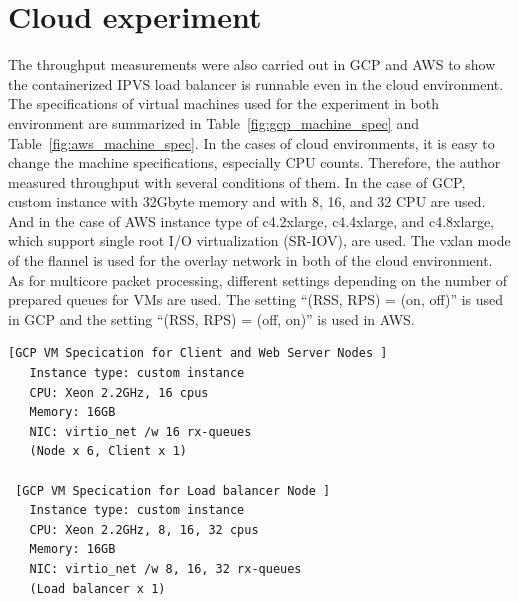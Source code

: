 \FloatBarrier

\section{Cloud experiment}

The throughput measurements were also carried out in GCP and AWS to show the containerized IPVS load balancer is runnable even in the cloud environment.
The specifications of virtual machines used for the experiment in both environment are summarized in Table~\ref{fig:gcp_machine_spec} and Table~\ref{fig:aws_machine_spec}.
In the cases of cloud environments, it is easy to change the machine specifications, especially CPU counts.
Therefore, the author measured throughput with several conditions of them.
In the case of GCP, custom instance with 32Gbyte memory and with 8, 16, and 32 CPU are used.
And in the case of AWS instance type of c4.2xlarge, c4.4xlarge, and c4.8xlarge, which support single root I/O virtualization (SR-IOV), are used.
The vxlan mode of the flannel is used for the overlay network in both of the cloud environment.
As for multicore packet processing, different settings depending on the number of prepared queues for VMs are used. 
The setting \enquote{(RSS, RPS) = (on, off)} is used in GCP and the setting \enquote{(RSS, RPS) = (off, on)} is used in AWS.

\begin{table}[h]

  \centering
  \begin{minipage}{0.9\columnwidth}
    \begin{lstlisting}[frame=lines,breaklines=true,basicstyle=\small\ttfamily]
 [GCP VM Specication for Client and Web Server Nodes ]
   Instance type: custom instance
   CPU: Xeon 2.2GHz, 16 cpus
   Memory: 16GB
   NIC: virtio_net /w 16 rx-queues
   (Node x 6, Client x 1)

 [GCP VM Specication for Load balancer Node ]
   Instance type: custom instance
   CPU: Xeon 2.2GHz, 8, 16, 32 cpus
   Memory: 16GB
   NIC: virtio_net /w 8, 16, 32 rx-queues
   (Load balancer x 1)
    \end{lstlisting}
  \end{minipage}

  \par\bigskip
  \centering
  \begin{minipage}{0.9\columnwidth}
    \caption[Virtual Machine specifications in GCP experiment]{
Virtual Machine specifications in GCP experiment.
The author measured throughputs using load balancer nodes with 8 CPUs, 16 CPUs, and 32 cups.
The number of rx-queues of each node was 8, 16 and 32, respectively.
Since the same number of rx-queues as the number CPU is prepared, the setting with \enquote{(rss, rps) = (on, off)} is used.
    }
    \label{fig:gcp_machine_spec}
  \end{minipage}
\end{table}

